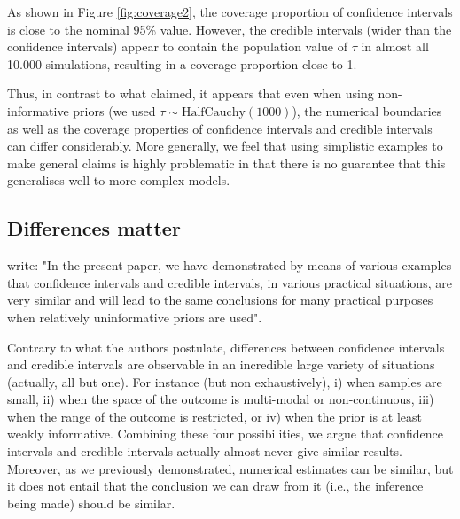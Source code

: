 \documentclass[a4paper,man,natbib,floatsintext,donotrepeattitle]{apa6}
\begin{document}
As shown in Figure \ref{fig:coverage2}, the coverage proportion of confidence intervals is close to the nominal 95\% value. However, the credible intervals (wider than the confidence intervals) appear to contain the population value of $\tau$ in almost all 10.000 simulations, resulting in a coverage proportion close to 1.

Thus, in contrast to what \cite{albers_credible_2018} claimed, it appears that even when using non-informative priors (we used $\tau \sim \mathrm{HalfCauchy}(1000)$), the numerical boundaries as well as the coverage properties of confidence intervals and credible intervals can differ considerably. More generally, we feel that using simplistic examples to make general claims is highly problematic in that there is no guarantee that this generalises well to more complex models.

\subsection{Differences matter}

\cite{albers_credible_2018} write: "In the present paper, we have demonstrated by means of various examples that confidence intervals and credible intervals, in various practical situations, are very similar and will lead to the same conclusions for many practical purposes when relatively uninformative priors are used".

Contrary to what the authors postulate, differences between confidence intervals and credible intervals are observable in an incredible large variety of situations (actually, all but one). For instance (but non exhaustively), i) when samples are small, ii) when the space of the outcome is multi-modal or non-continuous, iii) when the range of the outcome is restricted, or iv) when the prior is at least weakly informative. Combining these four possibilities, we argue that confidence intervals and credible intervals actually almost never give similar results. Moreover, as we previously demonstrated, numerical estimates can be similar, but it does not entail that the conclusion we can draw from it (i.e., the inference being made) should be similar.


\end{document}
